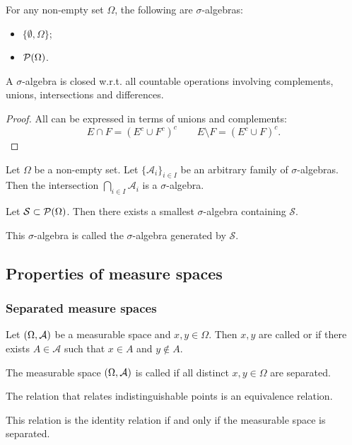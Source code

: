 \begin{example}
For any non-empty set $\Omega$, the following are $\sigma$-algebras:
\begin{itemize}
\item $\{\emptyset, \Omega\}$;
\item $\operatorname{\mathcal{P}}(\Omega)$.
\end{itemize}
\end{example}

\begin{lemma}
A $\sigma$-algebra is closed w.r.t. all countable operations involving complements, unions, intersections and differences.
\end{lemma}
\begin{proof}
All can be expressed in terms of unions and complements:
\[ E\cap F = (E^c\cup F^c)^c\qquad E\setminus F = (E^c\cup F)^c. \]
\end{proof}

\begin{lemma}
Let $\Omega$ be a non-empty set. Let $\{\mathcal{A}_i\}_{i\in I}$ be an arbitrary family of $\sigma$-algebras. Then the intersection $\bigcap_{i\in I}\mathcal{A}_i$ is a $\sigma$-algebra.
\end{lemma}
\begin{corollary}
Let $\mathcal{S}\subset \operatorname{\mathcal{P}}(\Omega)$. Then there exists a smallest $\sigma$-algebra containing $\mathcal{S}$.
\end{corollary}
This $\sigma$-algebra is called the $\sigma$-algebra generated by $\mathcal{S}$.

\subsection{Properties of measure spaces}
\subsubsection{Separated measure spaces}
\begin{definition}
Let $\left( \Omega,\mathcal{A} \right)$ be a measurable space and $x,y\in \Omega$. Then $x,y$ are called  or  if there exists $A\in \mathcal{A}$ such that $x\in A$ and $y\notin A$.

The measurable space $\left( \Omega,\mathcal{A} \right)$ is called  if all distinct $x,y\in \Omega$ are separated.
\end{definition}

\begin{lemma}
The relation that relates indistinguishable points is an equivalence relation.

This relation is the identity relation \textup{if and only if} the measurable space is separated.
\end{lemma}


